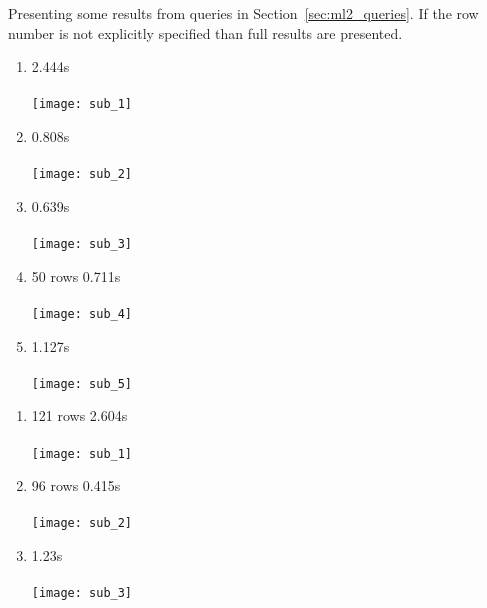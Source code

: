 
Presenting some results from queries in Section~\ref{sec:ml2_queries}.
If the row number is not explicitly specified than full results are presented.
\begin{enumerate}
    \item 2.444s\\ \\
      \texttt{[image: sub\_1]}
    \item 0.808s \\ \\
      \texttt{[image: sub\_2]}
    \item 0.639s \\ \\
      \texttt{[image: sub\_3]}
    \item 50 rows 0.711s\\ \\
      \texttt{[image: sub\_4]}
    \item 1.127s \\ \\
      \texttt{[image: sub\_5]}
\end{enumerate}
\begin{enumerate}
    \item 121 rows 2.604s \\ \\
      \texttt{[image: sub\_1]}
    \item 96 rows 0.415s \\ \\
      \texttt{[image: sub\_2]}
    \item 1.23s\\ \\
      \texttt{[image: sub\_3]}
\end{enumerate}

